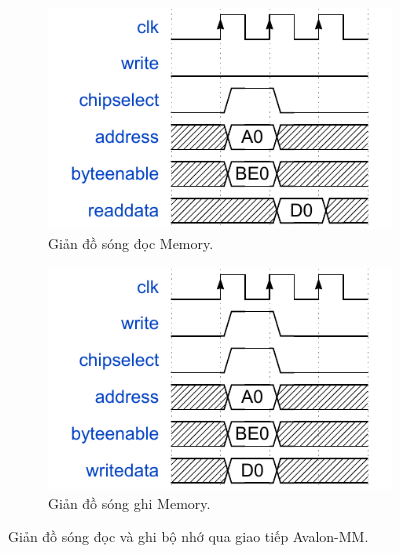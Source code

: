 \begin{figure}[htbp]
    \centering
    \begin{subfigure}[b]{0.48\textwidth}
        \centering
        \includegraphics[width=\linewidth]{Images/02_07_Memory_ReadWaveform.pdf}
        \caption{Giản đồ sóng đọc Memory.}
        \label{fig:02_07_memory_read_sub}
    \end{subfigure}
    \hfill %
    \begin{subfigure}[b]{0.48\textwidth}
        \centering
        \includegraphics[width=\linewidth]{Images/02_08_Memory_WriteWaveform.pdf}
        \caption{Giản đồ sóng ghi Memory.}
        \label{fig:02_08_memory_write_sub}
    \end{subfigure}
    \caption{Giản đồ sóng đọc và ghi bộ nhớ qua giao tiếp Avalon-MM.}
    \label{fig:memory_waveforms} %
\end{figure}


